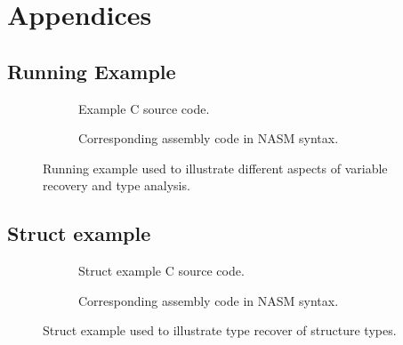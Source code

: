 
\onecolumn

\appendix
\setcounter{secnumdepth}{0}
\section{Appendices}
\setcounter{secnumdepth}{3}
\renewcommand{\thesubsection}{\Alph{subsection}}


\subsection{Running Example}
\label{app:running_example}

\begin{figure}[htbp]
	\centering
	\begin{subfigure}[ht]{0.3\textwidth}
		\centering
		
		\caption{Example C source code.}
		\label{fig:running_example_c}
	\end{subfigure}
	\qquad
	\begin{subfigure}[ht]{0.65\textwidth}
		\centering
		
		\caption{Corresponding assembly code in NASM syntax.}
		\label{fig:running_example_asm}
	\end{subfigure}
	\caption{Running example used to illustrate different aspects of variable recovery and type analysis.}
	\label{fig:running_example}
\end{figure}

\clearpage

\subsection{Struct example}
\label{app:struct_example}

\begin{figure}[htbp]
	\centering
	\begin{subfigure}[ht]{0.3\textwidth}
		\centering
		
		\caption{Struct example C source code.}
		\label{fig:struct_example_c}
	\end{subfigure}
	\qquad
	\begin{subfigure}[ht]{0.65\textwidth}
		\centering
		
		\caption{Corresponding assembly code in NASM syntax.}
		\label{fig:struct_example_asm}
	\end{subfigure}
	\caption{Struct example used to illustrate type recover of structure types.}
	\label{fig:struct_example}
\end{figure}
